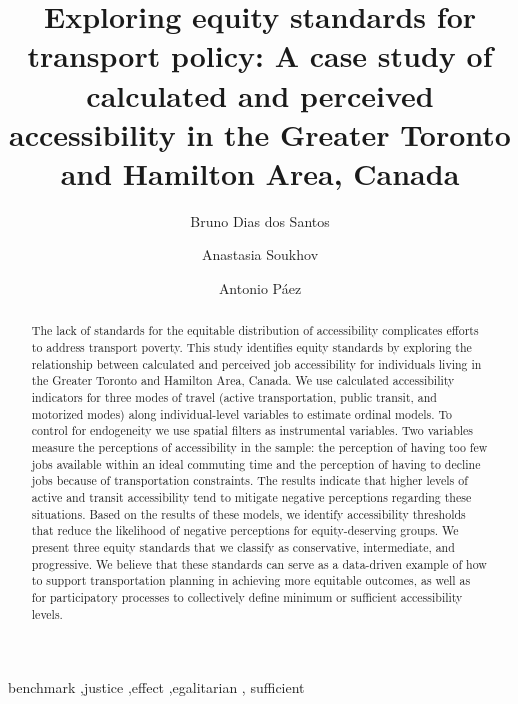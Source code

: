 \documentclass[preprint, 3p,
authoryear]{elsarticle} %
\begin{document}
\begin{frontmatter}

  \title{Exploring equity standards for transport policy: A case study
of calculated and perceived accessibility in the Greater Toronto and
Hamilton Area, Canada}
    \author[McMaster University]{Bruno Dias dos Santos%
  }
    \author[Western University]{Anastasia Soukhov%
  }
    \author[McMaster University]{Antonio Páez%
  }
  
  \begin{abstract}
  The lack of standards for the equitable distribution of accessibility
  complicates efforts to address transport poverty. This study
  identifies equity standards by exploring the relationship between
  calculated and perceived job accessibility for individuals living in
  the Greater Toronto and Hamilton Area, Canada. We use calculated
  accessibility indicators for three modes of travel (active
  transportation, public transit, and motorized modes) along
  individual-level variables to estimate ordinal models. To control for
  endogeneity we use spatial filters as instrumental variables. Two
  variables measure the perceptions of accessibility in the sample: the
  perception of having too few jobs available within an ideal commuting
  time and the perception of having to decline jobs because of
  transportation constraints. The results indicate that higher levels of
  active and transit accessibility tend to mitigate negative perceptions
  regarding these situations. Based on the results of these models, we
  identify accessibility thresholds that reduce the likelihood of
  negative perceptions for equity-deserving groups. We present three
  equity standards that we classify as conservative, intermediate, and
  progressive. We believe that these standards can serve as a
  data-driven example of how to support transportation planning in
  achieving more equitable outcomes, as well as for participatory
  processes to collectively define minimum or sufficient accessibility
  levels.
  \end{abstract}
    \begin{keyword}
    benchmark \sep justice \sep effect \sep egalitarian \sep 
    sufficient
  \end{keyword}
  
 \end{frontmatter}
\end{document}
